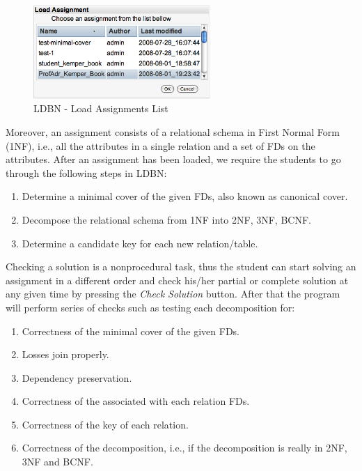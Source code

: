 \begin{figure}[h]
	\begin{center}
		\includegraphics[width=0.6\textwidth]{./img/screen02.png}
		\caption{LDBN - Load Assignments List}
		\label{fig:screen02}
	\end{center}
\end{figure}

Moreover, an assignment consists of a relational schema in First Normal Form (1NF), 
i.e., all the attributes in a single relation and a set of FDs on the attributes. 
After an assignment has been loaded, we require the students to go through the 
following steps in LDBN:
\begin{enumerate}
	\item Determine a minimal cover of the given FDs, also known as canonical cover.
	\item Decompose the relational schema from 1NF into 2NF, 3NF, BCNF. 
	\item Determine a candidate key for each new relation/table. 
\end{enumerate}

Checking a solution is a nonprocedural task, thus the student can start solving
an assignment in a different order and check his/her partial or complete 
solution at any given time by pressing the \textit{Check Solution} button. After that 
the program will perform series of checks such as testing each decomposition for: 
\begin{enumerate}
	\item Correctness of the minimal cover of the given FDs. 
	\item Losses join properly.
	\item Dependency preservation.
	\item Correctness of the associated with each relation FDs.
	\item Correctness of the key of each relation.
	\item Correctness of the decomposition, i.e., if the decomposition is really in 2NF, 3NF and BCNF.
\end{enumerate}

